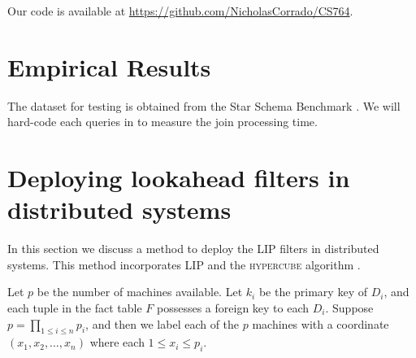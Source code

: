 \documentclass[10pt]{article}
\begin{document}
Our code is available at \url{https://github.com/NicholasCorrado/CS764}.



\section{Empirical Results}\label{sec:experiment}


The dataset for testing is obtained from the Star Schema Benchmark \cite{o2009star}. We will hard-code each queries in \cite{o2009star} to measure the join processing time.














\section{Deploying lookahead filters in distributed systems}

In this section we discuss a method to deploy the LIP filters in distributed systems. This method incorporates LIP and the \textsc{hypercube} algorithm \cite{zhu2017looking}.


Let $p$ be the number of machines available. Let $k_i$ be the primary key of $D_i$, and each tuple in the fact table $F$ possesses a foreign key to each $D_i$. Suppose $p = \prod_{1 \leq i \leq n} p_i$,  and then we label each of the $p$ machines with a coordinate $(x_1, x_2, \dots, x_n)$ where each $1 \leq x_i \leq p_i$.
\end{document}
